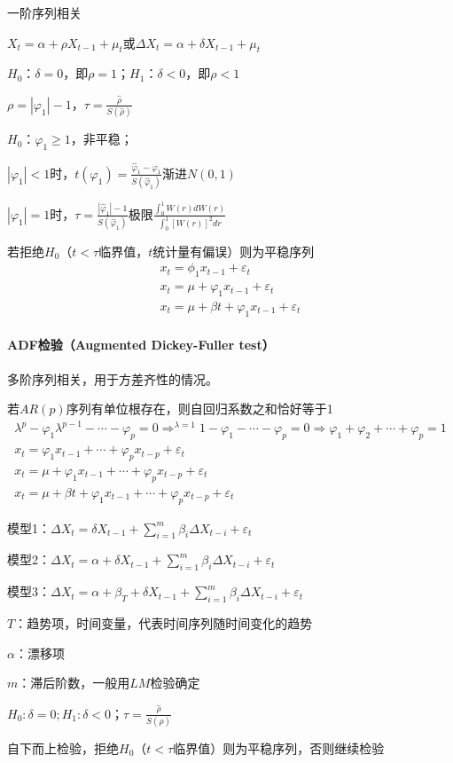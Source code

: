 \documentclass[12pt]{book}
\begin{document}
一阶序列相关

\par $X_t=\alpha+\rho X_{t-1}+\mu_t$或$\Delta X_t=\alpha +\delta X_{t-1}+\mu _{t}$  
\par $H_0$：$\delta =0$，即$\rho =1$；$H_1$：$\delta <0$，即$\rho <1$  
\par $\rho=\left|\varphi_1\right|-1， \tau=\frac{\hat{\rho}}{S(\hat{\rho})}$  
\par $H_0$：$\varphi _1≥1$，非平稳；  
\par $\left|\varphi_1\right|<1$时，$t(\varphi _1)=\frac{\hat{\varphi }_1-\varphi _1}{S(\hat{\varphi }_1)}$渐进$N(0,1)$  
\par $\left|\varphi_1\right|=1$时，$\tau =\frac{|\hat{\varphi  }_1|-1}{S(\hat{\varphi }_1)}$极限$\frac{\int_{0}^{1}W(r)dW(r)}{\int_{0}^{1}[W(r)]^2dr}$  
\par 若拒绝$H_0$（$t<\tau$临界值，$t$统计量有偏误）则为平稳序列  
\begin{gather*}
x_t=\phi_{1}x_{t-1}+\varepsilon_t\\
x_t=\mu+\varphi_{1}x_{t-1}+\varepsilon_t\\
x_t=\mu+\beta t+\varphi_{1}x_{t-1}+\varepsilon_t
\end{gather*}


\paragraph{ADF检验（Augmented Dickey-Fuller test）}

多阶序列相关，用于方差齐性的情况。

若$AR(p)$序列有单位根存在，则自回归系数之和恰好等于1  
\begin{gather*}
    \lambda^p-\varphi_1\lambda^{p-1}-\cdots-\varphi_p=0
    \Rightarrow^{\lambda=1} 1-\varphi_1-\cdots-\varphi_p=0
    \Rightarrow\varphi_1+\varphi_2+\cdots+\varphi_p=1\\
    x_t=\varphi_{1}x_{t-1}+\cdots+\varphi_{p}x_{t-p}+\varepsilon_t\\
    x_t=\mu+\varphi_{1}x_{t-1}+\cdots+\varphi_{p}x_{t-p}+\varepsilon_t \\
    x_t=\mu+\beta t+\varphi_{1}x_{t-1}+\cdots+\varphi_{p}x_{t-p}+\varepsilon_t
\end{gather*}


 
\par 模型1：$\Delta X_t=\delta X_{t-1}+\sum_{i=1}^{m}\beta _i\Delta X_{t-i}+\varepsilon _t$  
\par 模型2：$\Delta X_t=\alpha +\delta X_{t-1}+\sum_{i=1}^{m}\beta _i\Delta X_{t-i}+\varepsilon _{t}$  
\par 模型3：$\Delta X_t=\alpha +\beta _T+\delta X_{t-1}+\sum_{i=1}^{m}\beta _i\Delta X_{t-i}+\varepsilon _{t}$  
\par $T$：趋势项，时间变量，代表时间序列随时间变化的趋势  
\par $\alpha$：漂移项   
\par $m$：滞后阶数，一般用$LM$检验确定  
\par $H_0:\delta =0; H_1:\delta <0$；$\tau=\frac{\hat{\rho}}{S(\hat{\rho})}$  
\par 自下而上检验，拒绝$H_0$（$t<\tau$临界值）则为平稳序列，否则继续检验
\end{document}
